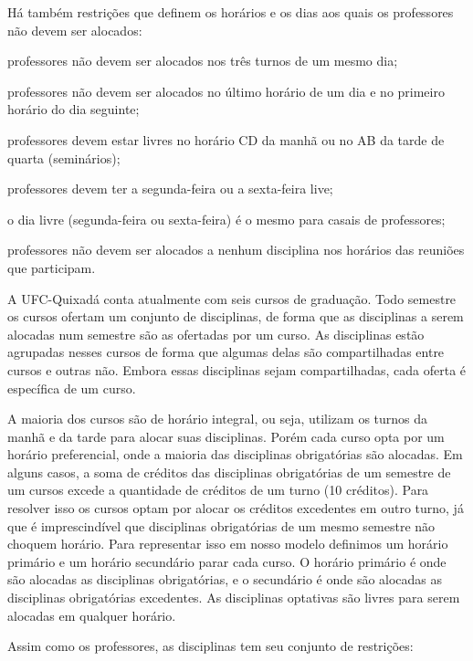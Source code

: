 Há também restrições que definem os horários e os dias aos quais os professores não devem ser alocados:

\begin{alineascomponto}
\item professores não devem ser alocados nos três turnos de um mesmo dia;
\item professores não devem ser alocados no último horário de um dia e no primeiro horário do dia seguinte;
\item professores devem estar livres no horário CD da manhã ou no AB da tarde de quarta (seminários);
\item professores devem ter a segunda-feira ou a sexta-feira live;
\item o dia livre (segunda-feira ou sexta-feira) é o mesmo para casais de professores;
\item professores não devem ser alocados a nenhum disciplina nos horários das reuniões que participam.
\end{alineascomponto}

A UFC-Quixadá conta atualmente com seis cursos de graduação. Todo semestre os cursos ofertam um conjunto de disciplinas, de forma que as disciplinas a serem alocadas num semestre são as ofertadas por um curso. As disciplinas estão agrupadas nesses cursos de forma que algumas delas são compartilhadas entre cursos e outras não. Embora essas disciplinas sejam compartilhadas, cada oferta é específica de um curso. 

A maioria dos cursos são de horário integral, ou seja, utilizam os turnos da manhã e da tarde para alocar suas disciplinas. Porém cada curso opta por um horário preferencial, onde a maioria das disciplinas obrigatórias são alocadas. Em alguns casos, a soma de créditos das disciplinas obrigatórias de um semestre de um cursos excede a quantidade de créditos de um turno (10 créditos). Para resolver isso os cursos optam por alocar os créditos excedentes em outro turno, já que é imprescindível que disciplinas obrigatórias de um mesmo semestre não choquem horário. Para representar isso em nosso modelo definimos um horário primário e um horário secundário parar cada curso. O horário primário é onde são alocadas as disciplinas obrigatórias, e o secundário é onde são alocadas as disciplinas obrigatórias excedentes. As disciplinas optativas são livres para serem alocadas em qualquer horário.

Assim como os professores, as disciplinas tem seu conjunto de restrições:


